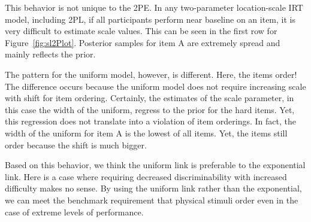 \documentclass[english,,man]{apa6}
\begin{document}
This behavior is not unique to the 2PE. In any two-parameter location-scale IRT model, including 2PL, if all participants perform near baseline on an item, it is very difficult to estimate scale values. This can be seen in the first row for Figure~\ref{fig:sl2Plot}. Posterior samples for item A are extremely spread and mainly reflects the prior.

The pattern for the uniform model, however, is different. Here, the items order! The difference occurs because the uniform model does not require increasing scale with shift for item ordering. Certainly, the estimates of the scale parameter, in this case the width of the uniform, regress to the prior for the hard items. Yet, this regression does not translate into a violation of item orderings. In fact, the width of the uniform for item A is the lowest of all items. Yet, the items still order because the shift is much bigger.

Based on this behavior, we think the uniform link is preferable to the exponential link. Here is a case where requiring decreased discriminability with increased difficulty makes no sense. By using the uniform link rather than the exponential, we can meet the benchmark requirement that physical stimuli order even in the case of extreme levels of performance.
\end{document}

